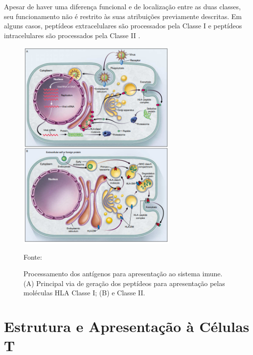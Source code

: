 \begin{justify}
Apesar de haver uma diferença funcional e de localização entre as duas classes, seu funcionamento não é restrito às suas atribuições previamente descritas. Em alguns casos, peptídeos extracelulares são processados pela Classe I e peptídeos intracelulares são processados pela Classe II \cite{Klein:2000}.

\begin{figure}
    \centering
    \caption{\justifying Processamento dos antígenos para apresentação ao sistema imune. (A) Principal via de geração dos peptídeos para apresentação pelas moléculas HLA Classe I; (B) e Classe II. }
    \includegraphics[width=0.7\textwidth]{Figuras/fig1.png}
    \label{fig:fig1}
    \begin{minipage}{0.7\textwidth} %
        \centering
        \footnotesize Fonte: 
    \end{minipage}

\end{figure}

\begin{figure}
\end{figure}

\section{Estrutura  e Apresentação à Células T}


\end{justify}
